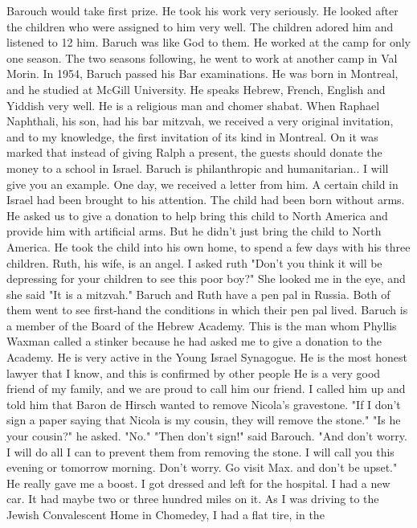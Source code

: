 Barouch would take first prize. He took his work very seriously. 
He looked after the children who were assigned to him very well. The 
children adored him and listened to 12 him. Baruch was like God to 
them. He worked at the camp for only one season. The two seasons 
following, he went to work at another camp in Val Morin. In 1954, 
Baruch passed his Bar examinations. 
He was born in Montreal, and he studied at McGill University. 
He speaks Hebrew, French, English and Yiddish very well. He is a 
religious man and chomer shabat. When Raphael Naphthali, his son, 
had his bar mitzvah, we received a very original invitation, and 
to my knowledge, the first invitation of its kind in Montreal. On 
it was marked that instead of giving Ralph a present, the guests 
should donate the money to a school in Israel. 
Baruch is philanthropic and humanitarian.. I will give you an 
example. One day, we received a letter from him. A certain child 
in Israel had been brought to his attention. The child had been 
born without arms. He asked us to give a donation to help bring this 
child to North America and provide him with artificial arms. But 
he didn't just bring the child to North America. He took the child 
into his own home, to spend a few days with his three children. Ruth, 
his wife, is an angel. I asked ruth "Don't you think it will be depressing for your children to see this poor boy?" She looked me 
in the eye, and she said "It is a mitzvah." Baruch and Ruth have a 
pen pal in Russia. Both of them went to see first-hand the conditions in which their pen pal lived. Baruch is a member of the 
Board of the Hebrew Academy. This is the man whom Phyllis Waxman 
called a stinker because he had asked me to give a donation to the 
Academy. He is very active in the Young Israel Synagogue. He is the 
most honest lawyer that I know, and this is confirmed by other people 
He is a very good friend of my family, and we are proud to call him 
our friend. 
I called him up and told him that Baron de Hirsch wanted to 
remove Nicola's gravestone. "If I don't sign a paper saying that 
Nicola is my cousin, they will remove the stone." 
"Is he your cousin?" he asked. 
"No." 
"Then don't sign!" said Barouch. "And don't worry. I will do 
all I can to prevent them from removing the stone. I will call you 
this evening or tomorrow morning. Don't worry. Go visit Max. and 
don't be upset." He really gave me a boost. 
I got dressed and left for the hospital. I had a new car. It 
had maybe two or three hundred miles on it. As I was driving to the 
Jewish Convalescent Home in Chomedey, I had a flat tire, in the 
